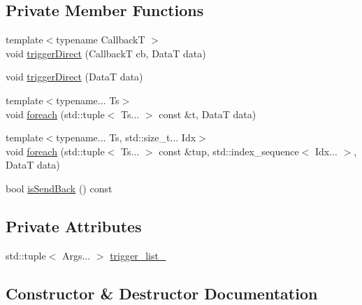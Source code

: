 \subsection*{Private Member Functions}
\begin{DoxyCompactItemize}
\item 
{\footnotesize template$<$typename CallbackT $>$ }\\void \hyperlink{structvt_1_1pipe_1_1interface_1_1_send_container_a9d5a3483c99e74b4f68a6e616cbc14a1}{trigger\+Direct} (CallbackT cb, DataT data)
\item 
void \hyperlink{structvt_1_1pipe_1_1interface_1_1_send_container_a6c504af8cd8a553fe059045660786803}{trigger\+Direct} (DataT data)
\item 
{\footnotesize template$<$typename... Ts$>$ }\\void \hyperlink{structvt_1_1pipe_1_1interface_1_1_send_container_ae564de48caa526d02fc218f39c4da8c9}{foreach} (std\+::tuple$<$ Ts... $>$ const \&t, DataT data)
\item 
{\footnotesize template$<$typename... Ts, std\+::size\+\_\+t... Idx$>$ }\\void \hyperlink{structvt_1_1pipe_1_1interface_1_1_send_container_ac3c7c21335376c4d20eee85de5f44885}{foreach} (std\+::tuple$<$ Ts... $>$ const \&tup, std\+::index\+\_\+sequence$<$ Idx... $>$, DataT data)
\item 
bool \hyperlink{structvt_1_1pipe_1_1interface_1_1_send_container_a10bb4ccfed5beef53a7e289d094cfed2}{is\+Send\+Back} () const
\end{DoxyCompactItemize}
\subsection*{Private Attributes}
\begin{DoxyCompactItemize}
\item 
std\+::tuple$<$ Args... $>$ \hyperlink{structvt_1_1pipe_1_1interface_1_1_send_container_ae4531eb2c073b81891360f98a7dc72c6}{trigger\+\_\+list\+\_\+}
\end{DoxyCompactItemize}


\subsection{Constructor \& Destructor Documentation}
\mbox{\label{structvt_1_1pipe_1_1interface_1_1_send_container_a8183aa3cc7165532ffc3b418316d0793}} 
